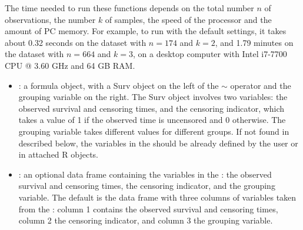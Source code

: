 \noindent The time needed to run these functions depends on the total number $n$ of observations, the number $k$ of samples, the speed of the processor and the amount of PC memory. For example, to run  with the default settings, it takes about 0.32 %
seconds on the dataset  with $n= 174$ and $k=2$, and 1.79 %
minutes on the dataset  with $n= 664$ and $k=3$, on 
a desktop computer with Intel i7-7700 CPU @ 3.60 GHz and 64 GB RAM.
\\
\begin{itemize}
\item {}: a formula object, with a Surv object on the left of the $\sim$ operator and the grouping variable on the right. The Surv object involves two variables: the observed survival and censoring times, and the censoring indicator, which takes a value of 1 if the observed time is uncensored and 0 otherwise. The grouping variable takes different values for different groups. If not found in  described below, the variables in the  should be already defined by the user or in attached R objects. 
\item {}: an optional data frame containing the variables in the : the observed survival and censoring times, the censoring indicator, and the grouping variable. The default is the data frame with three columns of variables taken from the : column 1 contains the observed survival and
censoring times, column 2 the censoring indicator, and column 3 the grouping variable.
\end{itemize}

